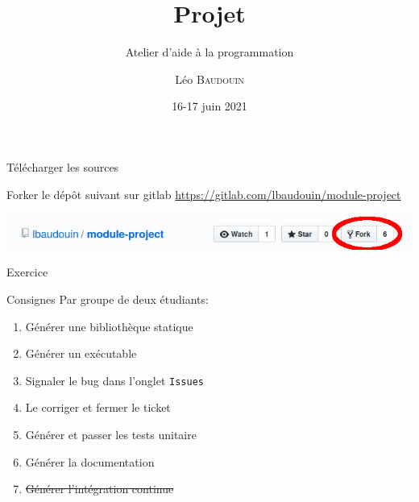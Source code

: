 \documentclass{beamer}
\title{Projet}
\subtitle{Atelier d'aide à la programmation}
\author{L\'eo \textsc{Baudouin}}
\institute{
  {\url{baudouin.leo @ gmail.com}}
}
\date{16-17 juin 2021}
\begin{document}
\begin{frame}
  \titlepage
\end{frame}


\section{}
\subsection{}

\begin{frame}[fragile]{Télécharger les sources}
  \begin{block}{Forker le dép\^ot suivant sur gitlab}
    \url{https://gitlab.com/lbaudouin/module-project}
  \end{block}
  
\includegraphics[width=\linewidth]{images/fork.png}  
  
\end{frame}

\begin{frame}[fragile]{Exercice}  
    \begin{exampleblock}{Consignes}
	Par groupe de deux étudiants:
    \begin{enumerate}
    \item Générer une bibliothèque statique
    \item Générer un exécutable
    \item Signaler le bug dans l'onglet \verb?Issues?
    \item Le corriger et fermer le ticket
    \item Générer et passer les tests unitaire
    \item Générer la documentation
    \item \sout{Générer l'intégration continue}
    \end{enumerate}
  \end{exampleblock}
\end{frame}

\end{document}
